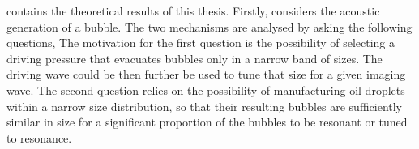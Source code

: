 

 contains the theoretical results of this thesis.
Firstly,  considers the acoustic generation of a bubble.
The two mechanisms are analysed by asking the following questions,
The motivation for the first question is the possibility 
of selecting a driving pressure that evacuates bubbles only in a narrow band of sizes.
The driving wave could be then further be used to tune that size for a given imaging wave.
The second question relies on the possibility of manufacturing oil droplets
within a narrow size distribution, 
so that their resulting bubbles are sufficiently similar in size 
for a significant proportion of the bubbles to be resonant or tuned to resonance.

